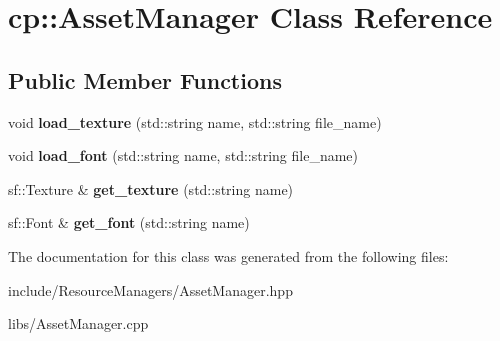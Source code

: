 \hypertarget{classcp_1_1_asset_manager}{}\section{cp\+:\+:Asset\+Manager Class Reference}
\label{classcp_1_1_asset_manager}
\subsection*{Public Member Functions}
\begin{DoxyCompactItemize}
\item 
\mbox{\label{classcp_1_1_asset_manager_a439d5d3edf6324cd329efb1e4f58c4ea}} 
void {\bfseries load\+\_\+texture} (std\+::string name, std\+::string file\+\_\+name)
\item 
\mbox{\label{classcp_1_1_asset_manager_a5cb482008a145460216ecab1b887f118}} 
void {\bfseries load\+\_\+font} (std\+::string name, std\+::string file\+\_\+name)
\item 
\mbox{\label{classcp_1_1_asset_manager_a4d6461b9f0cfd953aa9ccb4427e9fb78}} 
sf\+::\+Texture \& {\bfseries get\+\_\+texture} (std\+::string name)
\item 
\mbox{\label{classcp_1_1_asset_manager_a0b85829b4accbfd6394c1254328051ae}} 
sf\+::\+Font \& {\bfseries get\+\_\+font} (std\+::string name)
\end{DoxyCompactItemize}


The documentation for this class was generated from the following files\+:\begin{DoxyCompactItemize}
\item 
include/\+Resource\+Managers/Asset\+Manager.\+hpp\item 
libs/Asset\+Manager.\+cpp\end{DoxyCompactItemize}
